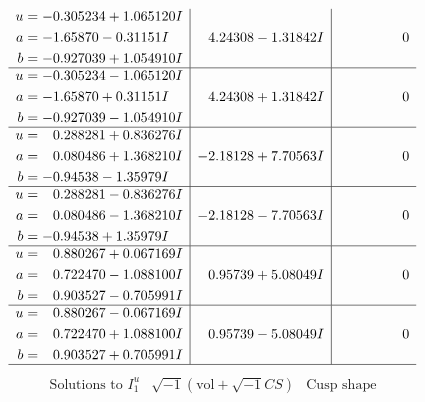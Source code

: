 \documentclass[1p]{elsarticle_modified}
\theoremstyle{definition}
\newcommand{\I}{\sqrt{-1}}
\begin{document}
$$\begin{array}{c|c|c}
\begin{aligned}
u &= -0.305234 + 1.065120 I \\
a &= -1.65870 - 0.31151 I \\
b &= -0.927039 + 1.054910 I\end{aligned}
 & \phantom{-}4.24308 - 1.31842 I & \phantom{-0.000000 } 0 \\ \hline\begin{aligned}
u &= -0.305234 - 1.065120 I \\
a &= -1.65870 + 0.31151 I \\
b &= -0.927039 - 1.054910 I\end{aligned}
 & \phantom{-}4.24308 + 1.31842 I & \phantom{-0.000000 } 0 \\ \hline\begin{aligned}
u &= \phantom{-}0.288281 + 0.836276 I \\
a &= \phantom{-}0.080486 + 1.368210 I \\
b &= -0.94538 - 1.35979 I\end{aligned}
 & -2.18128 + 7.70563 I & \phantom{-0.000000 } 0 \\ \hline\begin{aligned}
u &= \phantom{-}0.288281 - 0.836276 I \\
a &= \phantom{-}0.080486 - 1.368210 I \\
b &= -0.94538 + 1.35979 I\end{aligned}
 & -2.18128 - 7.70563 I & \phantom{-0.000000 } 0 \\ \hline\begin{aligned}
u &= \phantom{-}0.880267 + 0.067169 I \\
a &= \phantom{-}0.722470 - 1.088100 I \\
b &= \phantom{-}0.903527 - 0.705991 I\end{aligned}
 & \phantom{-}0.95739 + 5.08049 I & \phantom{-0.000000 } 0 \\ \hline\begin{aligned}
u &= \phantom{-}0.880267 - 0.067169 I \\
a &= \phantom{-}0.722470 + 1.088100 I \\
b &= \phantom{-}0.903527 + 0.705991 I\end{aligned}
 & \phantom{-}0.95739 - 5.08049 I & \phantom{-0.000000 } 0\\
 \hline 
 \end{array}$$\newpage$$\begin{array}{c|c|c}  
\text{Solutions to }I^u_{1}& \I (\text{vol} + \sqrt{-1}CS) & \text{Cusp shape}\\
 \hline 
\begin{aligned}

\end{aligned}
\end{array}$$
\end{document}
